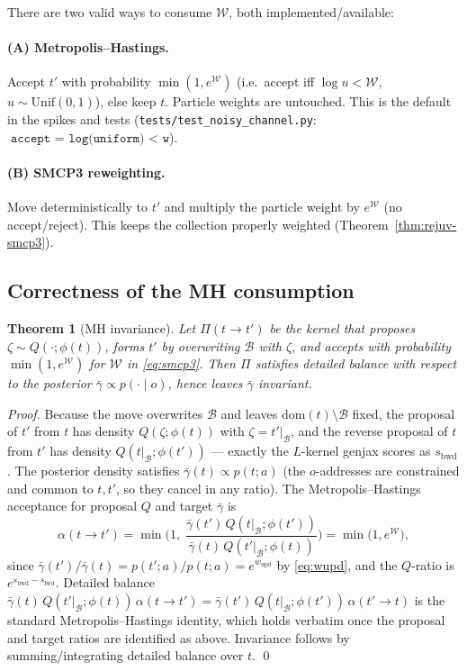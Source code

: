 \documentclass[11pt]{article}
\newcommand{\given}{\mid}
\newcommand{\code}[1]{\texttt{#1}}
\newtheorem{theorem}{Theorem}
\begin{document}
There are two valid ways to consume $\mathcal{W}$, both implemented/available:

\paragraph{(A) Metropolis--Hastings.} Accept $t'$ with probability $\min(1,e^{\mathcal W})$ (i.e.\
accept iff $\log u < \mathcal W$, $u\sim\mathrm{Unif}(0,1)$), else keep $t$. Particle weights are
untouched. This is the default in the spikes and tests
(\code{tests/test\_noisy\_channel.py}: $\;\code{accept = log(uniform) < w}$).

\paragraph{(B) SMCP3 reweighting.} Move deterministically to $t'$ and multiply the particle weight by
$e^{\mathcal W}$ (no accept/reject). This keeps the collection properly weighted (Theorem~\ref{thm:rejuv-smcp3}).

\subsection{Correctness of the MH consumption}

\begin{theorem}[MH invariance]\label{thm:mh}
Let $\Pi(t \to t')$ be the kernel that proposes $\zeta\sim Q(\cdot;\phi(t))$, forms $t'$ by
overwriting $\mathcal B$ with $\zeta$, and accepts with probability $\min(1,e^{\mathcal W})$ for
$\mathcal W$ in \eqref{eq:smcp3}. Then $\Pi$ satisfies detailed balance with respect to the posterior
$\bar\gamma \propto p(\cdot\given o)$, hence leaves $\bar\gamma$ invariant.
\end{theorem}

\begin{proof}
Because the move overwrites $\mathcal B$ and leaves $\mathrm{dom}(t)\setminus\mathcal B$ fixed, the
proposal of $t'$ from $t$ has density $Q(\zeta;\phi(t))$ with $\zeta = t'|_{\mathcal B}$, and the
reverse proposal of $t$ from $t'$ has density $Q(t|_{\mathcal B};\phi(t'))$ — exactly the $L$-kernel
genjax scores as $s_{\mathrm{bwd}}$. The posterior density satisfies
$\bar\gamma(t)\propto p(t;a)$ (the $o$-addresses are constrained and common to $t,t'$, so they cancel
in any ratio). The Metropolis--Hastings acceptance for proposal $Q$ and target $\bar\gamma$ is
\begin{equation}
  \alpha(t\to t') = \min\!\Big(1,\;\frac{\bar\gamma(t')\,Q(t|_{\mathcal B};\phi(t'))}{\bar\gamma(t)\,Q(t'|_{\mathcal B};\phi(t))}\Big)
  = \min\!\big(1, e^{\mathcal W}\big),
\end{equation}
since $\bar\gamma(t')/\bar\gamma(t) = p(t';a)/p(t;a) = e^{w_{\mathrm{upd}}}$ by \eqref{eq:wupd}, and
the $Q$-ratio is $e^{s_{\mathrm{bwd}}-s_{\mathrm{fwd}}}$. Detailed balance
$\bar\gamma(t)\,Q(t'|_{\mathcal B};\phi(t))\,\alpha(t\to t') = \bar\gamma(t')\,Q(t|_{\mathcal B};\phi(t'))\,\alpha(t'\to t)$
is the standard Metropolis--Hastings identity, which holds verbatim once the proposal and target
ratios are identified as above. Invariance follows by summing/integrating detailed balance over
$t$. \qed
\end{proof}
\end{document}
